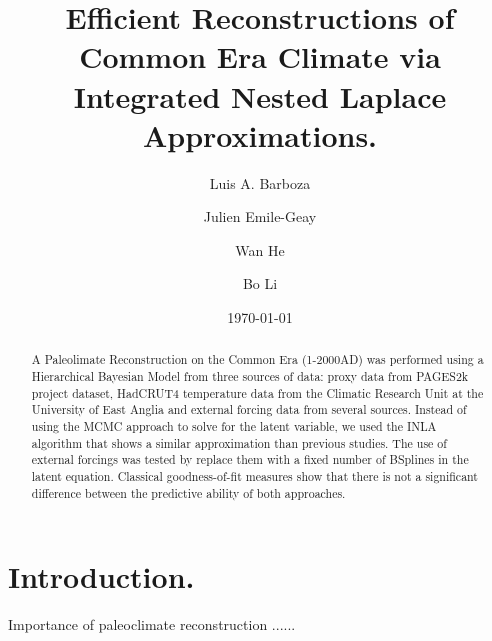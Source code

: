 \documentclass[11pt]{amsart}
\theoremstyle{plain}
\theoremstyle{definition}
\theoremstyle{remark}
\begin{document}
\title[Paleoclimate Reconstruction using INLA.]{Efficient Reconstructions of Common Era Climate via Integrated Nested Laplace Approximations.}

\author{Luis A. Barboza}
\address{Centro de Investigacion en Matematica Pura y Aplicada (CIMPA)-Escuela
  de Matematica, Universidad de Costa Rica\\
San Jos\'e, Costa Rica}


\author{Julien Emile-Geay}
\address{Department of Earth Sciences \\
  University of Southern California \\
  Los Angeles, California, USA.
}

\author{Wan He}

\author{Bo Li}
\address{Department of Statistics \\
  University of Illinois at Urbana-Champaign \\
  Champaign, Illinois, USA.
}



\date{\today}
\subjclass[2010]{}
\maketitle

\begin{abstract}
A Paleolimate Reconstruction on the Common Era (1-2000AD) was performed using a
Hierarchical Bayesian Model from three sources of data: proxy data from PAGES2k
project dataset, HadCRUT4 temperature data from the Climatic Research Unit
at the University of East Anglia and external forcing data from several sources.
Instead of using the MCMC approach to solve for the latent variable, we used the
INLA algorithm that shows a similar approximation than previous studies. The use
of external forcings was tested by replace them with a fixed number of
BSplines in the latent equation. Classical goodness-of-fit measures show that there is not a significant
difference between the predictive ability of both approaches. 
\end{abstract}

\section{Introduction.}
\label{sec:intro}

Importance of paleoclimate reconstruction ......
\end{document}
